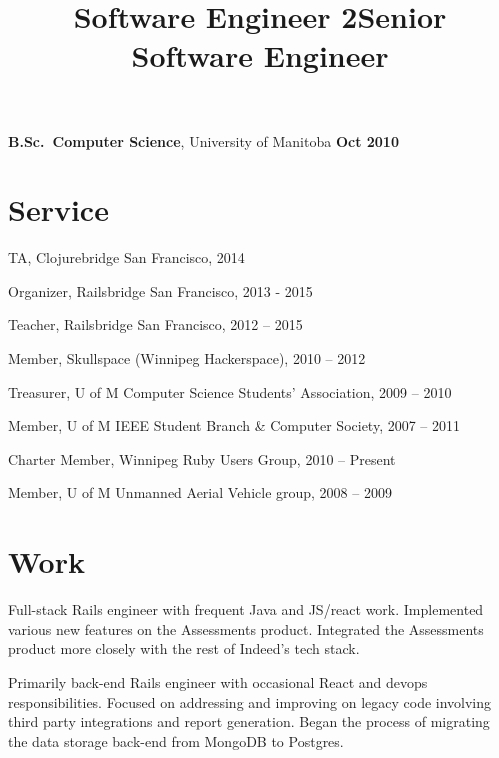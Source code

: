 \documentclass[margin,line,letterpaper]{resume}
\begin{document}
\begin{resume}
  {\bf B.Sc.~Computer Science}, University of Manitoba \hfill {\bf Oct 2010}

  \section{\mysidestyle Service}

  \begin{list2}
    \item TA, Clojurebridge San Francisco, 2014
    \item Organizer, Railsbridge San Francisco, 2013 - 2015
    \item Teacher, Railsbridge San Francisco, 2012 -- 2015
    \item Member, Skullspace (Winnipeg Hackerspace), 2010 -- 2012
    \item Treasurer, U of M Computer Science Students' Association, 2009 -- 2010
    \item Member, U of M IEEE Student Branch \& Computer Society, 2007 -- 2011
    \item Charter Member, Winnipeg Ruby Users Group, 2010 -- Present
    \item Member, U of M Unmanned Aerial Vehicle group, 2008 -- 2009
 \end{list2}


  \section{\mysidestyle Work}

  \title{\bf Software Engineer 2}
  \location{}
  \begin{position}
    Full-stack Rails engineer with frequent Java and JS/react work.
    Implemented various new features on the Assessments product.
    Integrated the Assessments product more closely with the rest
    of Indeed's tech stack.
  \end{position}

  \title{\bf Senior Software Engineer}
  \location{}
  \begin{position}
    Primarily back-end Rails engineer with occasional React and
    devops responsibilities. Focused on addressing and improving on
    legacy code involving third party integrations and report
    generation. Began the process of migrating the data storage
    back-end from MongoDB to Postgres.
  \end{position}


\end{resume}
\end{document}
